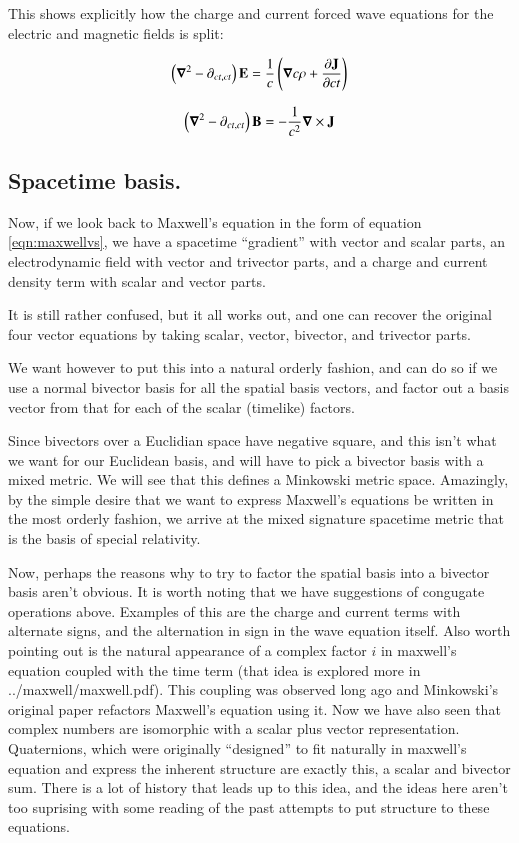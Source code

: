 \documentclass{article}      %
\newcommand{\spacegrad}[0]{\boldsymbol{\nabla}}
\begin{document}
This shows explicitly how the charge and current forced wave equations for the 
electric and magnetic fields is split:

\begin{equation*}
\left(\spacegrad^2 - \partial_{ct, ct}\right) \BE = 
\inv{c } \left(\spacegrad c \rho + \frac{\partial \BJ}{\partial c t} \right)
\end{equation*}

\begin{equation*}
\left(\spacegrad^2 - \partial_{ct, ct}\right) \BB = - \inv{c^2 }  \spacegrad \cross \BJ
\end{equation*}

\subsection{ Spacetime basis. }

Now, if we look back to Maxwell's equation in the form of equation \ref{eqn:maxwellvs}, we have a spacetime ``gradient'' with vector and scalar parts, an electrodynamic field with vector and trivector parts, and a charge and current density term with scalar and vector parts.  

It is still rather confused, but it all works out, and one can recover the original four vector equations by taking scalar, vector, bivector, and trivector parts. 

We want however to put this into a natural orderly fashion, and can do so if we use a normal bivector basis for all the spatial basis vectors, and factor out a basis vector from that for each of the scalar (timelike) factors.

Since bivectors over a Euclidian space have negative square, and this isn't what we want for our Euclidean basis, and will have to
pick a bivector basis with a mixed metric.  We will see that this defines a Minkowski metric space.  Amazingly, by the simple 
desire that we want to express
Maxwell's equations be written in the most orderly fashion, we arrive at the mixed signature spacetime metric that is the basis
of special relativity.

Now, perhaps the reasons why to try to factor the spatial basis into a bivector basis aren't obvious.  It is worth noting that
we have suggestions of congugate operations above.  Examples of this are the charge and current terms with alternate signs, and
the alternation in sign in the wave equation itself.  Also worth pointing out is the natural appearance of a complex factor $i$
in maxwell's equation coupled with the time term (that idea is explored more in ../maxwell/maxwell.pdf).  This coupling was 
observed long ago and Minkowski's original paper refactors Maxwell's equation using it.  Now we have also seen that complex numbers
are isomorphic with a scalar plus vector representation.  Quaternions, which were originally ``designed'' to fit naturally 
in maxwell's equation and express the inherent structure are exactly this, a scalar and bivector sum.  There is a lot of history
that leads up to this idea, and the ideas here aren't too suprising with some reading of the past attempts to put structure to these
equations.
\end{document}

